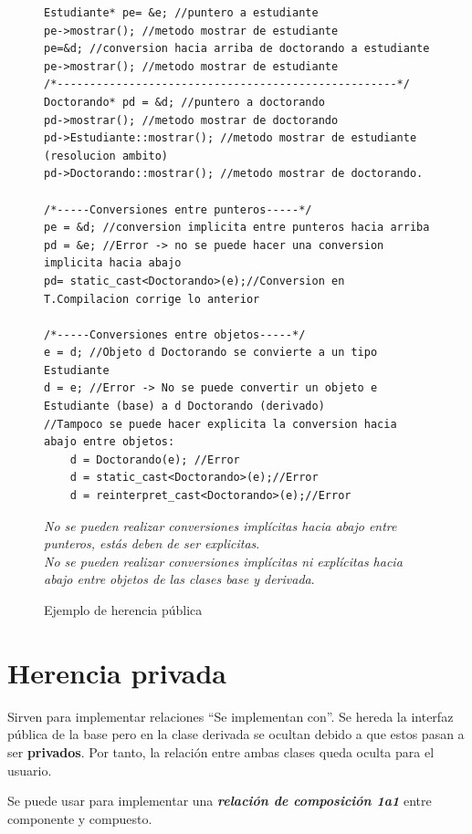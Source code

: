 \begin{figure}[h]
	\begin{center}
	\begin{lstlisting}[frame=single]
Estudiante* pe= &e; //puntero a estudiante
pe->mostrar(); //metodo mostrar de estudiante
pe=&d; //conversion hacia arriba de doctorando a estudiante
pe->mostrar(); //metodo mostrar de estudiante
/*----------------------------------------------------*/
Doctorando* pd = &d; //puntero a doctorando
pd->mostrar(); //metodo mostrar de doctorando
pd->Estudiante::mostrar(); //metodo mostrar de estudiante (resolucion ambito)
pd->Doctorando::mostrar(); //metodo mostrar de doctorando.

/*-----Conversiones entre punteros-----*/
pe = &d; //conversion implicita entre punteros hacia arriba
pd = &e; //Error -> no se puede hacer una conversion implicita hacia abajo
pd= static_cast<Doctorando>(e);//Conversion en T.Compilacion corrige lo anterior

/*-----Conversiones entre objetos-----*/
e = d; //Objeto d Doctorando se convierte a un tipo Estudiante
d = e; //Error -> No se puede convertir un objeto e Estudiante (base) a d Doctorando (derivado)
//Tampoco se puede hacer explicita la conversion hacia abajo entre objetos:
	d = Doctorando(e); //Error
	d = static_cast<Doctorando>(e);//Error
	d = reinterpret_cast<Doctorando>(e);//Error
		\end{lstlisting}
	\caption{Ejemplo de herencia pública}\vspace{1cm}
	\textit{No se pueden realizar conversiones implícitas hacia abajo entre punteros, estás deben de ser explicitas}.\\
	\textit{No se pueden realizar conversiones implícitas ni explícitas hacia abajo entre objetos de las clases base y derivada}.

\end{center}
\end{figure}	

\newpage
\section{Herencia privada}
\vspace{-0.5cm}
Sirven para implementar relaciones “Se implementan con”.
Se hereda la interfaz pública de la base pero en la clase derivada se ocultan debido a que estos pasan a ser \textbf{privados}.
Por tanto, la relación entre ambas clases queda oculta para el usuario.

Se puede usar para implementar una \textbf{\textit{relación de composición 1a1}} entre componente y compuesto.

